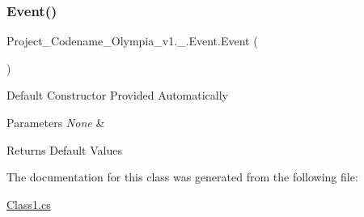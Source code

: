 \subsubsection{\texorpdfstring{Event()}{Event()}}
{\footnotesize\ttfamily Project\+\_\+\+Codename\+\_\+\+Olympia\+\_\+v1.\+\_.\+Event.\+Event (\begin{DoxyParamCaption}{ }\end{DoxyParamCaption})\hspace{0.3cm}{\ttfamily [inline]}}

Default Constructor Provided Automatically 
\begin{DoxyParams}{Parameters}
{\em None} & \\
\hline
\end{DoxyParams}
\begin{DoxyReturn}{Returns}
Default Values 
\end{DoxyReturn}


The documentation for this class was generated from the following file\+:\begin{DoxyCompactItemize}
\item 
\hyperlink{Class1_8cs}{Class1.\+cs}\end{DoxyCompactItemize}
